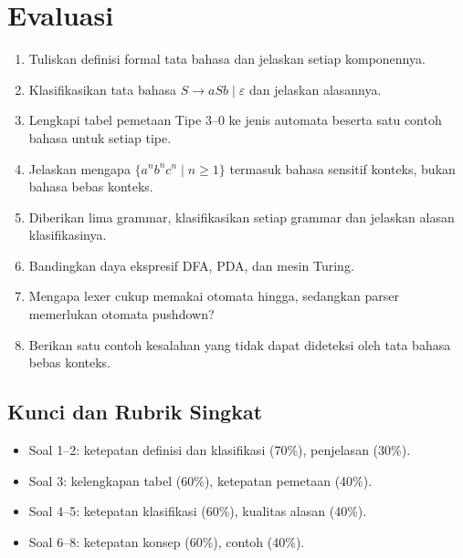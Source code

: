 \section*{Evaluasi}

\begin{enumerate}[label=\arabic*.,leftmargin=*]
  \item Tuliskan definisi formal tata bahasa dan jelaskan setiap
        komponennya.
  \item Klasifikasikan tata bahasa \(S \to aSb \mid \varepsilon\) dan
        jelaskan alasannya.
  \item Lengkapi tabel pemetaan Tipe 3--0 ke jenis automata beserta
        satu contoh bahasa untuk setiap tipe.
  \item Jelaskan mengapa \(\{a^n b^n c^n \mid n \ge 1\}\) termasuk
        bahasa sensitif konteks, bukan bahasa bebas konteks.
  \item Diberikan lima grammar, klasifikasikan setiap grammar dan
        jelaskan alasan klasifikasinya.
  \item Bandingkan daya ekspresif DFA, PDA, dan mesin Turing.
  \item Mengapa lexer cukup memakai otomata hingga, sedangkan parser
        memerlukan otomata pushdown?
  \item Berikan satu contoh kesalahan yang tidak dapat dideteksi oleh
        tata bahasa bebas konteks.
\end{enumerate}

\subsection*{Kunci dan Rubrik Singkat}
\begin{itemize}[leftmargin=*]
  \item Soal 1--2: ketepatan definisi dan klasifikasi (70\%),
        penjelasan (30\%).
  \item Soal 3: kelengkapan tabel (60\%), ketepatan pemetaan (40\%).
  \item Soal 4--5: ketepatan klasifikasi (60\%), kualitas alasan
        (40\%).
  \item Soal 6--8: ketepatan konsep (60\%), contoh (40\%).
\end{itemize}
